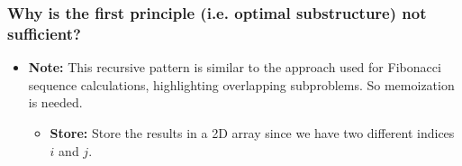 \subsubsection{Why is the first principle (i.e. optimal substructure) not sufficient?}
\begin{example}


    \begin{itemize}
        \item \textbf{Note:} This recursive pattern is similar to the approach used for Fibonacci sequence calculations, highlighting overlapping subproblems. So memoization is needed.
        \begin{itemize}
            \item \textbf{Store:} Store the results in a 2D array since we have two different indices $i$ and $j$.
        \end{itemize}
    \end{itemize}
\end{example}

